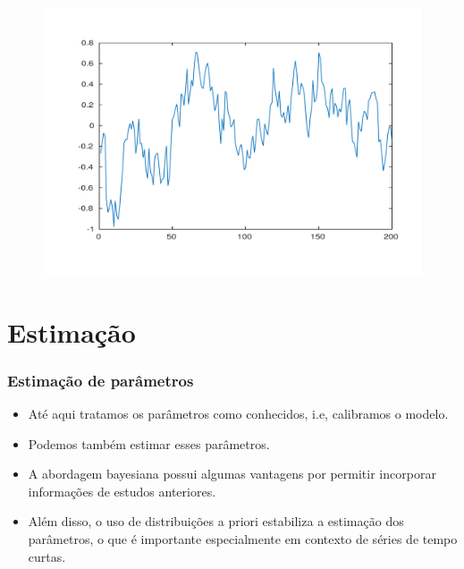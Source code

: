 \documentclass[xcolor=pdftex,dvipsnames,table]{beamer}
\newcommand{\ft}{\frametitle}
\begin{document}

\begin{frame}
\begin{figure}[h!]
\includegraphics[scale=0.35]{hiato.pdf}
\label{fig1}
\end{figure}
\end{frame}


\section{Estimação}

\begin{frame}
\ft{Estimação de parâmetros}

\begin{itemize}
\item Até aqui tratamos os parâmetros como conhecidos, i.e, calibramos o modelo.

\item Podemos também estimar esses parâmetros.

\item A abordagem bayesiana possui algumas vantagens por permitir incorporar informações de estudos anteriores.

\item Além disso, o uso de distribuições a priori estabiliza a estimação dos
parâmetros, o que é importante especialmente em contexto de séries
de tempo curtas.
\end{itemize}
\end{frame}
\end{document}
